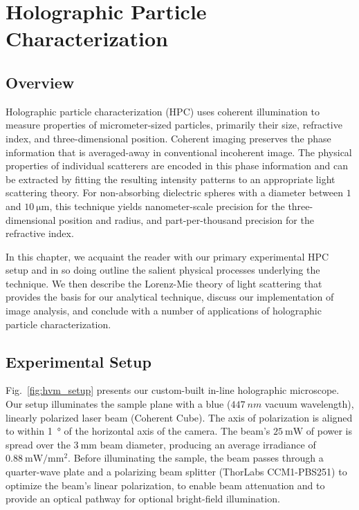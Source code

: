 \chapter{Holographic Particle Characterization}
\label{ch:hvm}

\newcommand{\einc}{\vec{E}_{\text{inc}}}
\newcommand{\escat}{\vec{E}_{\text{s}}}
\newcommand{\eadd}{\vec{E}_{\text{add}}}

\section{Overview}

Holographic particle characterization (HPC) uses coherent
illumination to measure properties of micrometer-sized particles,
primarily their size, refractive index, and three-dimensional position.
Coherent imaging preserves the phase information that is averaged-away
in conventional incoherent image. The physical properties of individual
scatterers are encoded in this phase information and can be extracted by fitting
the resulting intensity patterns to an appropriate light scattering theory.
For non-absorbing dielectric spheres with a diameter between $\num{1}$ and $\SI{10}{\um}$,
this technique yields nanometer-scale precision for the three-dimensional
position and radius, and part-per-thousand precision for the refractive
index\cite{krishnatreya14}.

In this chapter, we acquaint the reader with our primary experimental
HPC setup and in so doing outline the salient physical processes underlying
the technique. We then describe the Lorenz-Mie theory of light
scattering that provides the basis for our analytical technique,
discuss our implementation of image analysis, and 
conclude with a number of applications of holographic particle
characterization.

\section{Experimental Setup}
\label{ch:hvm:sec:hvm}

Fig.~\ref{fig:hvm_setup} presents our custom-built in-line holographic
microscope. Our setup illuminates the sample plane with a blue
($\SI{447}{nm}$ vacuum wavelength), linearly polarized laser beam
(Coherent Cube). The axis of polarization is aligned to within
\SI{1}{\degree} of the horizontal axis of the camera. 
The beam's $\SI{25}{\mW}$ of power is spread over
the $\SI{3}{\mm}$ beam diameter, producing an average irradiance
of $\SI{0.88}{\mW / \mm^2}$. Before illuminating the sample, the beam
passes through a quarter-wave plate and a polarizing beam splitter
(ThorLabs CCM1-PBS251) to optimize the beam's linear polarization, to
enable beam attenuation and to provide an optical pathway for
optional bright-field illumination.


